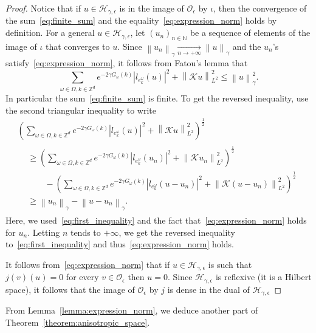 \documentclass[10pt]{amsart}
\theoremstyle{definition}\newtheorem{defi}[theo]{Definition}\newtheorem{rema}[theo]{Remark}\newtheorem{exam}[theo]{Example}\newtheorem{exem}[theo]{Example}\newtheorem{nota}[theo]{Notation}
\newcommand{\p}[1]{\left(#1\right)}
\newcommand{\n}[1]{\left\|#1\right\|}
\newcommand{\va}[1]{\left|#1\right|}
\newcommand{\clO}{\mathcal{O}}
\newcommand{\clH}{\mathcal{H}}
\newcommand{\clK}{\mathcal{K}}
\newcommand{\bbZ}{\mathbb{Z}}
\newcommand{\bbN}{\mathbb{N}}
\begin{document}
\begin{proof}
Notice that if $u \in \clH_{\gamma,\epsilon}$ is in the image of $\clO_\epsilon$ by $\iota$, then the convergence of the sum~\eqref{eq:finite_sum} and the equality~\eqref{eq:expression_norm} holds by definition. For a general $u \in \clH_{\gamma,\epsilon}$, let $(u_n)_{n \in \bbN}$ be a sequence of elements of the image of $\iota$ that converges to $u$. Since $\n{u_n}_{\gamma} \underset{n \to + \infty}{\to} \n{u}_\gamma$ and the $u_n$'s satisfy~\eqref{eq:expression_norm}, it follows from Fatou's lemma that
\begin{equation}\label{eq:first_inequality}
\sum_{\omega \in \Omega, k \in \bbZ^d} e^{-2 \gamma G_\omega(k)} \va{l_{e_k^\omega}(u)}^2 + \n{\clK u}_{L^2}^2 \leq \n{u}_\gamma^2.
\end{equation}
In particular the sum~\eqref{eq:finite_sum} is finite. To get the reversed inequality, use the second triangular inequality to write
\begin{multline*}
 \p{\sum_{\omega \in \Omega, k \in \bbZ^d} e^{-2 \gamma G_\omega(k)} \va{l_{e_k^\omega}(u)}^2 + \n{\clK u}_{L^2}^2}^{\frac{1}{2}} \\
\begin{aligned}
& \geq \p{\sum_{\omega \in \Omega, k \in \bbZ^d} e^{-2 \gamma G_\omega(k)} \va{l_{e_k^\omega}(u_n)}^2 + \n{\clK u_n}_{L^2}^2}^{\frac{1}{2}} \\
& \qquad - \p{\sum_{\omega \in \Omega, k \in \bbZ^d} e^{-2 \gamma G_\omega(k)} \va{l_{e_k^\omega}(u - u_n)}^2 + \n{\clK (u-u_n)}_{L^2}^2}^{\frac{1}{2}}\\
& \geq \n{u_n}_\gamma - \n{u-u_n}_\gamma.
\end{aligned}
\end{multline*}
Here, we used~\eqref{eq:first_inequality} and the fact that~\eqref{eq:expression_norm} holds for $u_n$. Letting $n$ tends to $+ \infty$, we get the reversed inequality to~\eqref{eq:first_inequality} and thus~\eqref{eq:expression_norm} holds.

It follows from~\eqref{eq:expression_norm} that if $u \in \clH_{\gamma,\epsilon}$ is such that $j(v)(u) = 0$ for every $v \in \clO_{\epsilon}$ then $u = 0$. Since $\clH_{\gamma,\epsilon}$ is reflexive (it is a Hilbert space), it follows that the image of $\clO_\epsilon$ by $j$ is dense in the dual of $\clH_{\gamma,\epsilon}$
\end{proof}

From Lemma~\ref{lemma:expression_norm}, we deduce another part of Theorem~\ref{theorem:anisotropic_space}.
\end{document}
